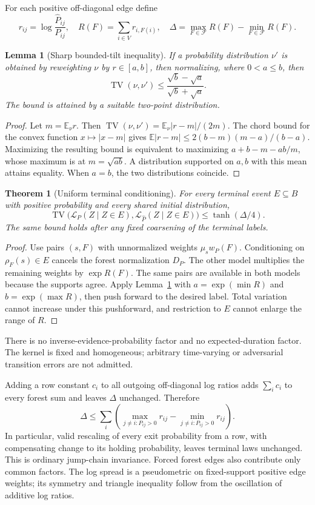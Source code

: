 \documentclass[11pt]{article}
\newtheorem{theorem}{Theorem}
\newtheorem{lemma}{Lemma}
\newcommand{\TV}{\operatorname{TV}}
\newcommand{\E}{\mathbb E}
\begin{document}
For each positive off-diagonal edge define
\[
 r_{ij}=\log\frac{\widehat P_{ij}}{P_{ij}},\quad
 R(F)=\sum_{i\in V}r_{i,F(i)},\quad
 \Delta=\max_{F\in\mathcal F}R(F)-\min_{F\in\mathcal F}R(F).
\]

\begin{lemma}[Sharp bounded-tilt inequality]\label{lem:tilt}
If a probability distribution $\nu'$ is obtained by reweighting $\nu$
by $r\in[a,b]$, then normalizing, where $0<a\le b$, then
\[
 \TV(\nu,\nu')\le\frac{\sqrt b-\sqrt a}{\sqrt b+\sqrt a}.
\]
The bound is attained by a suitable two-point distribution.
\end{lemma}
\begin{proof}
Let $m=\E_\nu r$. Then $\TV(\nu,\nu')=\E_\nu|r-m|/(2m)$.
The chord bound for the convex function $x\mapsto|x-m|$ gives
$\E|r-m|\le2(b-m)(m-a)/(b-a)$. Maximizing the resulting bound
is equivalent to maximizing $a+b-m-ab/m$, whose maximum is at
$m=\sqrt{ab}$. A distribution supported on $a,b$ with this mean
attains equality. When $a=b$, the two distributions coincide.
\end{proof}

\begin{theorem}[Uniform terminal conditioning]\label{thm:main}
For every terminal event $E\subseteq B$ with positive probability and
every shared initial distribution,
\[
 \boxed{\quad
 \TV\bigl(\mathcal L_P(Z\mid Z\in E),
         \mathcal L_{\widehat P}(Z\mid Z\in E)\bigr)
 \le \tanh(\Delta/4).
 \quad}
\]
The same bound holds after any fixed coarsening of the terminal labels.
\end{theorem}
\begin{proof}
Use pairs $(s,F)$ with unnormalized weights $\mu_s w_P(F)$.
Conditioning on $\rho_F(s)\in E$ cancels the forest normalization $D_P$.
The other model multiplies the remaining weights by $\exp R(F)$.
The same pairs are available in both models because the supports agree.
Apply Lemma~\ref{lem:tilt} with $a=\exp(\min R)$ and $b=\exp(\max R)$,
then push forward to the desired label. Total variation cannot increase
under this pushforward, and restriction to $E$ cannot enlarge the range
of $R$.
\end{proof}

There is no inverse-evidence-probability factor and no expected-duration
factor. The kernel is fixed and homogeneous; arbitrary time-varying or
adversarial transition errors are not admitted.

Adding a row constant $c_i$ to all outgoing off-diagonal log ratios adds
$\sum_i c_i$ to every forest sum and leaves $\Delta$ unchanged. Therefore
\[
 \Delta\le\sum_i\left(\max_{j\ne i:P_{ij}>0}r_{ij}
                         -\min_{j\ne i:P_{ij}>0}r_{ij}\right).
\]
In particular, valid rescaling of every exit probability from a row,
with compensating change to its holding probability, leaves terminal laws
unchanged. This is ordinary jump-chain invariance. Forced forest edges
also contribute only common factors. The log spread is a pseudometric
on fixed-support positive edge weights; its symmetry and triangle
inequality follow from the oscillation of additive log ratios.
\end{document}
